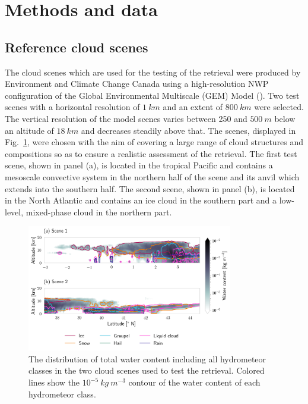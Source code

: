 \documentclass[journal abbreviation, manuscript]{copernicus}
\begin{document}
\section{Methods and data}
\label{sec:methods_and_data}

\subsection{Reference cloud scenes}

The cloud scenes which are used for the testing of the retrieval were produced
by Environment and Climate Change Canada using a high-resolution NWP
configuration of the Global Environmental Multiscale (GEM) Model
(\cite{cote98}). Two test scenes with a horizontal resolution of $1\ \unit{km}$
and an extent of $800\ \unit{km}$ were selected. The vertical resolution of the
model scenes varies between 250 and $500\ \unit{m}$ below an altitude of
$18\ \unit{km}$ and decreases steadily above that. The scenes, displayed in
Fig.~\ref{fig:overview}, were chosen with the aim of covering a large range of
cloud structures and compositions so as to ensure a realistic assessment of the
retrieval. The first test scene, shown in panel (a), is located in the tropical
Pacific and contains a mesoscale convective system in the northern half of the
scene and its anvil which extends into the southern half. The second scene,
shown in panel (b), is located in the North Atlantic and contains an ice cloud
in the southern part and a low-level, mixed-phase cloud in the northern part.

\begin{figure}[h!]
\centering
\includegraphics[width = 0.8\textwidth]{../plots/scene_overview.png}
\caption{The distribution of total water content including all hydrometeor
  classes in the two cloud scenes used to test the retrieval. Colored lines show the
  $10^{-5}\ \unit{kg\ m^{-3}}$ contour of the water content of each hydrometeor class.}
\label{fig:overview}
\end{figure}
\end{document}
